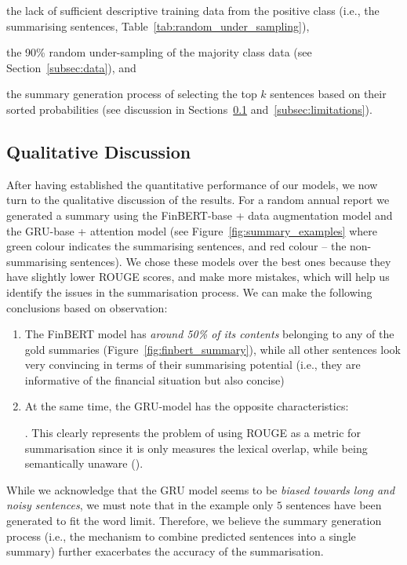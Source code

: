 \begin{itemize}
    \begin{enumerate*}
        \item the lack of sufficient descriptive training data from the positive class (i.e., the summarising sentences, Table~\ref{tab:random_under_sampling}),
        \item the 90\% random under-sampling of the majority class data (see Section~\ref{subsec:data}), and
        \item the summary generation process of selecting the top $k$ sentences based on their sorted probabilities (see discussion in Sections~\ref{subsec:qualitative-discussion} and~\ref{subsec:limitations}).
    \end{enumerate*}
\end{itemize}

\subsection{Qualitative Discussion}\label{subsec:qualitative-discussion}
After having established the quantitative performance of our models, we now turn to the qualitative discussion of the results.
For a random annual report we generated a summary using the FinBERT-base + data augmentation model and
the GRU-base + attention model (see Figure~\ref{fig:summary_examples}
where green colour indicates the summarising sentences, and red colour -- the non-summarising sentences).
We chose these models over the best ones because they have slightly lower ROUGE scores, and make more mistakes, which will help us identify the issues in the summarisation process.
We can make the following conclusions based on observation:
\begin{enumerate}
    \item The FinBERT model has \emph{around 50\% of its contents} belonging to any of the gold summaries (Figure~\ref{fig:finbert_summary}),
        while all other sentences look very convincing in terms of their summarising potential (i.e., they are informative of the financial situation but also concise)
    \item At the same time, the GRU-model has the opposite characteristics:
    .
    This clearly represents the problem of using ROUGE as a metric for summarisation since it is only measures the lexical overlap, while being semantically unaware (\cite{akter-etal-2022-revisiting}).
\end{enumerate}
While we acknowledge that the GRU model seems to be \emph{biased towards long and noisy sentences}, we must note that in the example
only $5$ sentences have been generated to fit the word limit.
Therefore, we believe the summary generation process (i.e., the mechanism to combine predicted sentences into a single summary) further
exacerbates the accuracy of the summarisation.

